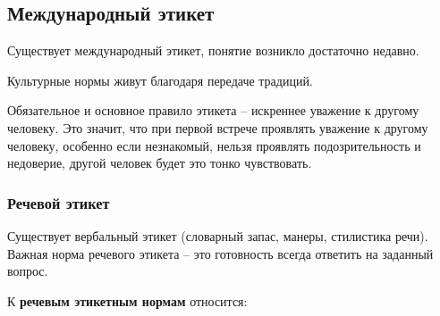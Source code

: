 \documentclass{article}
\begin{document}
\subsection{Международный этикет}

Существует международный этикет, понятие возникло достаточно недавно.

Культурные нормы живут благодаря передаче традиций.

Обязательное и основное правило этикета – искреннее уважение к другому человеку. Это значит, что при первой встрече проявлять уважение к другому человеку, особенно если незнакомый, нельзя проявлять подозрительность и недоверие, другой человек будет это тонко чувствовать.

\subsubsection{Речевой этикет}

Существует вербальный этикет (словарный запас, манеры, стилистика речи). Важная норма речевого этикета – это готовность всегда ответить на заданный вопрос.

К \textbf{речевым этикетным нормам} относится:
\end{document}
